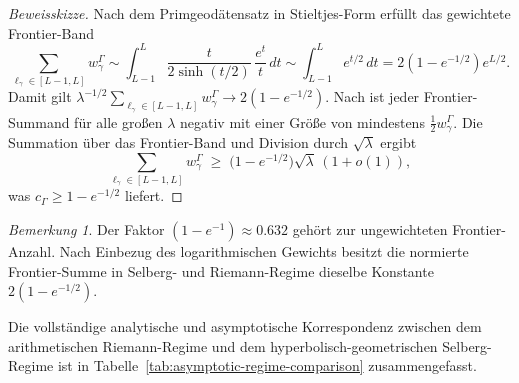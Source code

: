 \documentclass[12pt,a4paper]{article}
\theoremstyle{definition}
\theoremstyle{remark}
\newtheorem{remark}[theorem]{Bemerkung}
\begin{document}
\begin{proof}[Beweisskizze]
Nach dem Primgeodätensatz in Stieltjes-Form erfüllt das gewichtete
Frontier-Band
\[
\sum_{\ell_\gamma\in[L-1,L]} w^\Gamma_\gamma
\sim
\int_{L-1}^{L} \frac{t}{2\sinh(t/2)}\,\frac{e^t}{t}\,dt
\sim
\int_{L-1}^{L} e^{t/2}\,dt
= 2(1-e^{-1/2})e^{L/2}.
\]
Damit gilt $\lambda^{-1/2}\sum_{\ell_\gamma\in[L-1,L]} w^\Gamma_\gamma
\to 2(1-e^{-1/2})$. Nach \cite[Lem.~A.3]{Geiger2026partII}
ist jeder Frontier-Summand für alle großen $\lambda$ negativ mit einer Größe von mindestens
$\tfrac{1}{2}w^\Gamma_\gamma$.  Die Summation über das Frontier-Band
und Division durch $\sqrt\lambda$ ergibt
\[
\sum_{\ell_\gamma\in[L-1,L]} w^\Gamma_\gamma \;\ge\;
\bigl(1-e^{-1/2}\bigr)\sqrt\lambda\,(1+o(1)),
\]
was $c_\Gamma \ge 1-e^{-1/2}$ liefert.
\end{proof}

\begin{remark}
Der Faktor $(1-e^{-1}) \approx 0.632$ gehört zur ungewichteten Frontier-Anzahl.
Nach Einbezug des logarithmischen Gewichts besitzt die normierte Frontier-Summe
in Selberg- und Riemann-Regime dieselbe Konstante $2(1-e^{-1/2})$.
\end{remark}

Die vollständige analytische und asymptotische Korrespondenz zwischen dem arithmetischen
Riemann-Regime und dem hyperbolisch-geometrischen Selberg-Regime ist in
Tabelle~\ref{tab:asymptotic-regime-comparison} zusammengefasst.
\end{document}
